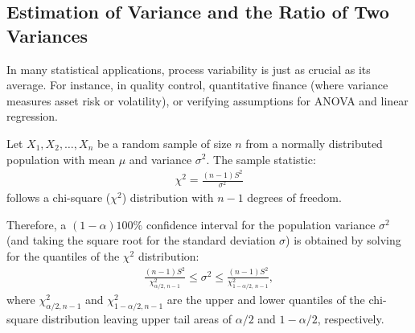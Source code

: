 \subsection{Estimation of Variance and the Ratio of Two Variances}

In many statistical applications, process variability is just as crucial as its average. For instance, in quality control, quantitative finance (where variance measures asset risk or volatility), or verifying assumptions for ANOVA and linear regression.

\begin{teorema}
	Let $X_1, X_2, \ldots, X_n$ be a random sample of size $n$ from a normally distributed population with mean $\mu$ and variance $\sigma^2$. The sample statistic:
	\begin{align}
		\chi^2 = \frac{(n-1)S^2}{\sigma^2}
	\end{align}
	follows a chi-square ($\chi^2$) distribution with $n-1$ degrees of freedom.
	
	Therefore, a $(1-\alpha)100\%$ confidence interval for the population variance $\sigma^2$ (and taking the square root for the standard deviation $\sigma$) is obtained by solving for the quantiles of the $\chi^2$ distribution:
	\begin{align}
		\frac{(n-1)S^2}{\chi^2_{\alpha/2, \, n-1}} \leq \sigma^2 \leq \frac{(n-1)S^2}{\chi^2_{1-\alpha/2, \, n-1}},
	\end{align}
	where $\chi^2_{\alpha/2, n-1}$ and $\chi^2_{1-\alpha/2, n-1}$ are the upper and lower quantiles of the chi-square distribution leaving upper tail areas of $\alpha/2$ and $1-\alpha/2$, respectively.
\end{teorema}

